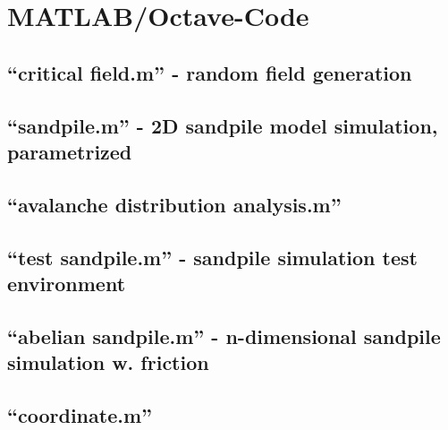 




\startnewchapter

\chapter{MATLAB/Octave-Code}\label{chp:matlab}
\thispagestyle{fancy}

\section{``critical field.m'' - random field generation}

\vspace{2em}

\section{``sandpile.m'' - 2D sandpile model simulation, parametrized}

\vspace{2em}

\section{``avalanche distribution analysis.m''}

\vspace{2em}

\section{``test sandpile.m'' - sandpile simulation test environment}

\vspace{2em}

\section{``abelian sandpile.m'' - n-dimensional sandpile simulation w. friction}

\vspace{2em}

\section{``coordinate.m''}

\vspace{2em}

